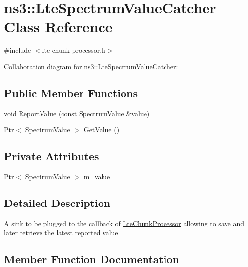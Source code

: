 \hypertarget{classns3_1_1LteSpectrumValueCatcher}{}\section{ns3\+:\+:Lte\+Spectrum\+Value\+Catcher Class Reference}
\label{classns3_1_1LteSpectrumValueCatcher}


{\ttfamily \#include $<$lte-\/chunk-\/processor.\+h$>$}



Collaboration diagram for ns3\+:\+:Lte\+Spectrum\+Value\+Catcher\+:
\subsection*{Public Member Functions}
\begin{DoxyCompactItemize}
\item 
void \hyperlink{classns3_1_1LteSpectrumValueCatcher_ac6f95cc36b8362ef2fc516b0e14613d4}{Report\+Value} (const \hyperlink{classns3_1_1SpectrumValue}{Spectrum\+Value} \&value)
\item 
\hyperlink{classns3_1_1Ptr}{Ptr}$<$ \hyperlink{classns3_1_1SpectrumValue}{Spectrum\+Value} $>$ \hyperlink{classns3_1_1LteSpectrumValueCatcher_ac0f438e153b19df0aee089578d4a22a9}{Get\+Value} ()
\end{DoxyCompactItemize}
\subsection*{Private Attributes}
\begin{DoxyCompactItemize}
\item 
\hyperlink{classns3_1_1Ptr}{Ptr}$<$ \hyperlink{classns3_1_1SpectrumValue}{Spectrum\+Value} $>$ \hyperlink{classns3_1_1LteSpectrumValueCatcher_a3a509e2c3d7da4c244d24267f0a66dd3}{m\+\_\+value}
\end{DoxyCompactItemize}


\subsection{Detailed Description}
A sink to be plugged to the callback of \hyperlink{classns3_1_1LteChunkProcessor}{Lte\+Chunk\+Processor} allowing to save and later retrieve the latest reported value 

\subsection{Member Function Documentation}
